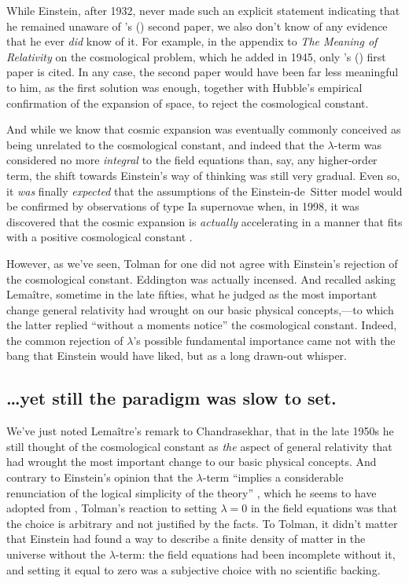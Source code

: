 \documentclass[12 pt]{article}
\def\citeapos#1{\citeauthor{#1}'s (\citeyear{#1})}
\begin{document}
While Einstein, after 1932, never made such an explicit statement indicating that he remained unaware of \citeapos{Friedmann1924} second paper, we also don't know of any evidence that he ever \textit{did} know of it. For example, in the appendix to \textit{The Meaning of Relativity} on the cosmological problem, which he added in 1945, only \citeapos{Friedmann1922} first paper is cited. In any case, the second paper would have been far less meaningful to him, as the first solution was enough, together with Hubble's empirical confirmation of the expansion of space, to reject the cosmological constant. 

And while we know that cosmic expansion was eventually commonly conceived as being unrelated to the cosmological constant, and indeed that the $\lambda$-term was considered no more \textit{integral} to the field equations than, say, any higher-order term, the shift towards Einstein's way of thinking was still very gradual. Even so, it \textit{was} finally \textit{expected} that the assumptions of the Einstein-de~Sitter model would be confirmed by observations of type Ia supernovae when, in 1998, it was discovered that the cosmic expansion is \textit{actually} accelerating in a manner that fits with a positive cosmological constant \citep{Riess1998,Perlmutter1999}.

However, as we've seen, Tolman for one did not agree with Einstein's rejection of the cosmological constant. Eddington was actually incensed. And \citet{Chandrasekhar1983} recalled asking Lema\^{i}tre, sometime in the late fifties, what he judged as the most important change general relativity had wrought on our basic physical concepts,---to which the latter replied ``without a moments notice'' the cosmological constant. Indeed, the common rejection of $\lambda$'s possible fundamental importance came not with the bang that Einstein would have liked, but as a long drawn-out whisper.

\subsection{\ldots yet still the paradigm was slow to set.}
\label{sec:4.3}
We've just noted Lema\^{i}tre's remark to Chandrasekhar, that in the late 1950s he still thought of the cosmological constant as \textit{the} aspect of general relativity that had wrought the most important change to our basic physical concepts. And contrary to Einstein's opinion that the $\lambda$-term ``implies a considerable renunciation of the logical simplicity of the theory'' \citep[p.~685]{Einstein1949}, which he seems to have adopted from \citet{deSitter1917a}, Tolman's reaction to setting $\lambda=0$ in the field equations was that the choice is arbitrary and not justified by the facts. To Tolman, it didn't matter that Einstein had found a way to describe a finite density of matter in the universe without the $\lambda$-term: the field equations had been incomplete without it, and setting it equal to zero was a subjective choice with no scientific backing. 
\end{document}
